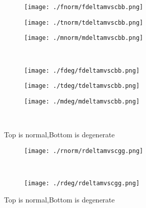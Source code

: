 \documentclass[aps,floats,floatfix,nofootinbib]{revtex4-1}
\begin{document}
\begin{center}
\begin{figure}
\begin{subfigure}{0.3\textwidth}
\texttt{[image: ./fnorm/fdeltamvscbb.png]}
\label{}
\end{subfigure}
\begin{subfigure}{0.3\textwidth}
\texttt{[image: ./tnorm/tdeltamvscbb.png]}
\label{}
\end{subfigure}
\begin{subfigure}{0.3\textwidth}
\texttt{[image: ./mnorm/mdeltamvscbb.png]}
\label{}
\end{subfigure}\\
\begin{subfigure}{0.3\textwidth}
\texttt{[image: ./fdeg/fdeltamvscbb.png]}
\label{}
\end{subfigure}
\begin{subfigure}{0.3\textwidth}
\texttt{[image: ./tdeg/tdeltamvscbb.png]}
\label{}
\end{subfigure}
\begin{subfigure}{0.3\textwidth}
\texttt{[image: ./mdeg/mdeltamvscbb.png]}
\label{}
\end{subfigure}\\
\caption{Top is normal,Bottom is degenerate}
\end{figure}
\end{center}

\begin{center}
\begin{figure}
\begin{subfigure}{1.0\textwidth}
\texttt{[image: ./rnorm/rdeltamvscgg.png]}
\label{}
\end{subfigure}\\
\begin{subfigure}{1.0\textwidth}
\texttt{[image: ./rdeg/rdeltamvscgg.png]}
\label{}
\end{subfigure}
\caption{Top is normal,Bottom is degenerate}
\end{figure}
\end{center}
\end{document}
